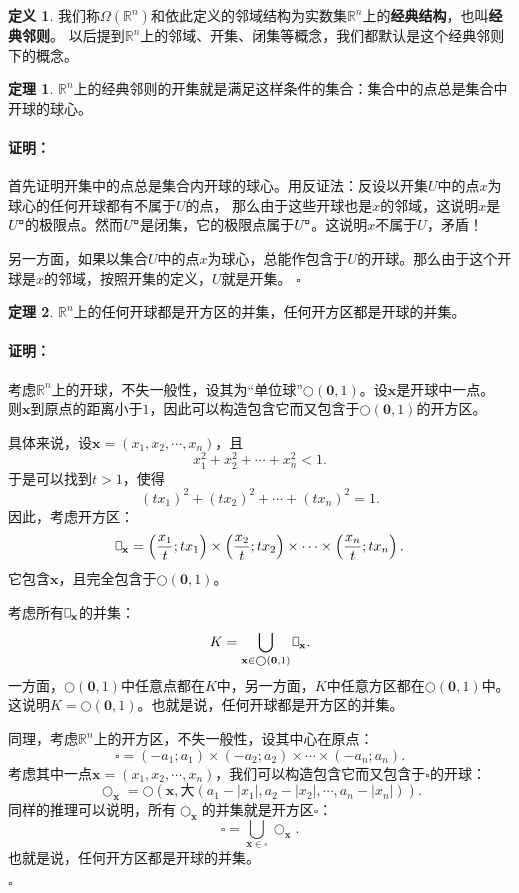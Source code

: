 \documentclass[12pt,UTF8]{ctexbook}
\newcommand{\rectbx}{%
    \mathord{\text{%
        \tikz[baseline] \draw (0,.1ex) -- (.4em,.1ex) -- (.4em,1.5ex) -- (0em,1.5ex) -- cycle;}
    }
}
\newcommand{\bu}{\mathbin{\text{\tikz[baseline=-0.6ex]{
    \node[draw, fill=black, minimum size=0.8ex, inner sep=0pt, rectangle] (bu) {};
    \node[draw=none, fill=white, minimum size=0.6ex, inner sep=0pt, circle] at (bu.center) {};
}}}}
\theoremstyle{definition}
\newtheorem{df}{定义}[section]
\newtheorem{tm}{定理}[section]
\theoremstyle{plain}
\renewenvironment{proof}{\paragraph{\textbf{证明：}}}{\hfill$\square$}
\begin{document}
\begin{appendix}
\begin{df}
    我们称$\Omega(\mathbb{R}^n)$和依此定义的邻域结构为实数集$\mathbb{R}^n$上的\textbf{经典结构}，也叫\textbf{经典邻则}。
    以后提到$\mathbb{R}^n$上的邻域、开集、闭集等概念，我们都默认是这个经典邻则下的概念。
\end{df}

\begin{tm}\label{tm:b-0-10}
    $\mathbb{R}^n$上的经典邻则的开集就是满足这样条件的集合：集合中的点总是集合中开球的球心。
\end{tm}

\begin{proof}
    首先证明开集中的点总是集合内开球的球心。用反证法：反设以开集$U$中的点$x$为球心的任何开球都有不属于$U$的点，
    那么由于这些开球也是$x$的邻域，这说明$x$是$U^{\bu}$的极限点。然而$U^{\bu}$是闭集，它的极限点属于$U^{\bu}$。这说明$x$不属于$U$，矛盾！

    另一方面，如果以集合$U$中的点$x$为球心，总能作包含于$U$的开球。那么由于这个开球是$x$的邻域，按照开集的定义，$U$就是开集。
\end{proof}

\begin{tm}\label{tm:b-1-30}
    $\mathbb{R}^n$上的任何开球都是开方区的并集，任何开方区都是开球的并集。
\end{tm}

\begin{proof}
    考虑$\mathbb{R}^n$上的开球，不失一般性，设其为“单位球”$\bigcirc(\mathbf{0}, 1)$。设$\mathbf{x}$是开球中一点。
    则$\mathbf{x}$到原点的距离小于$1$，因此可以构造包含它而又包含于$\bigcirc(\mathbf{0}, 1)$的开方区。

    具体来说，设$\mathbf{x} = (x_1, x_2, \cdots, x_n)$，且
    $$ x_1^2 + x_2^2 + \cdots + x_n^2 < 1.$$
    于是可以找到$t>1$，使得
    $$ (tx_1)^2 + (tx_2)^2 + \cdots + (tx_n)^2 = 1.$$
    因此，考虑开方区：
    $$ \rectbx_{\mathbf{x}} = \left(\frac{x_1}{t};tx_1\right)\times\left(\frac{x_2}{t};tx_2\right)\times\cdots\times\left(\frac{x_n}{t};tx_n\right).$$
    它包含$\mathbf{x}$，且完全包含于$\bigcirc(\mathbf{0}, 1)$。

    考虑所有$\rectbx_{\mathbf{x}}$的并集：
    $$ K = \bigcup_{\mathbf{x}\in \bigcirc(\mathbf{0}, 1)} \rectbx_{\mathbf{x}}. $$
    一方面，$\bigcirc(\mathbf{0}, 1)$中任意点都在$K$中，另一方面，$K$中任意方区都在$\bigcirc(\mathbf{0}, 1)$中。
    这说明$K = \bigcirc(\mathbf{0}, 1)$。也就是说，任何开球都是开方区的并集。

    同理，考虑$\mathbb{R}^n$上的开方区，不失一般性，设其中心在原点：
    $$ \square = (-a_1;a_1)\times(-a_2;a_2)\times\cdots\times(-a_n;a_n). $$
    考虑其中一点$\mathbf{x} = (x_1, x_2, \cdots, x_n)$，我们可以构造包含它而又包含于$\square$的开球：
    $$ \bigcirc_{\mathbf{x}} = \bigcirc(\mathbf{x}, \text{大}(a_1 - |x_1|, a_2 - |x_2|, \cdots, a_n - |x_n|)). $$
    同样的推理可以说明，所有$\bigcirc_{\mathbf{x}}$的并集就是开方区$\square$：
    $$ \square = \bigcup_{\mathbf{x}\in \square} \bigcirc_{\mathbf{x}}. $$
    也就是说，任何开方区都是开球的并集。


\end{proof}
\end{appendix}
\end{document}
